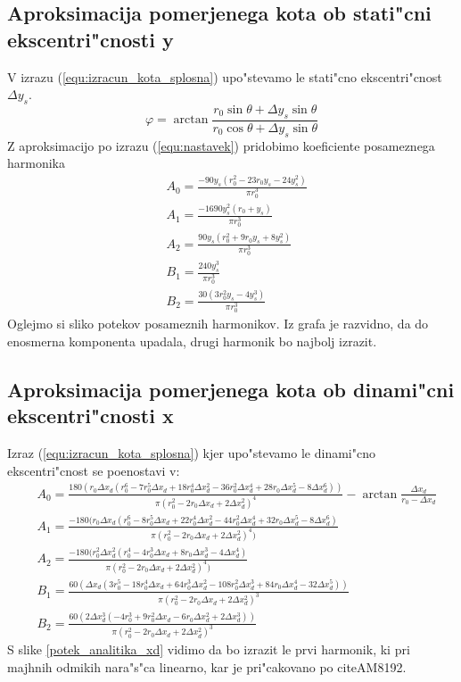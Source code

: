 \subsection{Aproksimacija pomerjenega kota ob stati"cni ekscentri"cnosti y}
V izrazu (\ref{equ:izracun_kota_splosna}) upo"stevamo le stati"cno ekscentri"cnost $\Delta y_s$.
\begin{equation}
\label{equ:izracun_kota_ys}
\varphi=\arctan \frac{r_0 \sin\theta +\Delta y_s \sin\theta}{r_0 \cos\theta +\Delta y_s \sin\theta}
\end{equation}
Z aproksimacijo po izrazu (\ref{equ:nastavek}) pridobimo koeficiente posameznega harmonika
\begin{eqnarray}
&A_0=\frac{-90 y_s (r_0^2-23r_0 y_s-24y _s^2)}{\pi r_0^3}\\
&A_1=\frac{-1690 y_s^2(r_0+y_s)}{\pi r_0^3}\\
&A_2=\frac{90 y_s(r_0^2+9r_0y_s+8y_s^2)}{\pi r_0^3}\\
&B_1=\frac{240 y_s^3}{\pi r_0^3}\\
&B_2=\frac{30 (3 r_0^2y_s-4 y_s^3)}{\pi r_0^3}
\end{eqnarray}
Oglejmo si sliko potekov posameznih harmonikov.
Iz grafa je razvidno, da do enosmerna komponenta upadala, drugi harmonik bo najbolj izrazit.
\subsection{Aproksimacija pomerjenega kota ob dinami"cni ekscentri"cnosti x}
Izraz  (\ref{equ:izracun_kota_splosna}) kjer upo"stevamo le dinami"cno ekscentri"cnost se poenostavi v:
\begin{eqnarray}
&A_0=\frac{180(r_0 \Delta x_d(r_0^6-7r_0^5 \Delta x_d+18r_0^4 \Delta x_d^2-36r_0^2 \Delta x_d^4 +28r_0 \Delta x_d^5-8 \Delta x_d^6))}{\pi(r_0^2-2r_0 \Delta x_d+2 \Delta x_d^2)^4}-\arctan \frac{\Delta x_d}{r_0- \Delta x_d}\\
&A_1=\frac{-180(r_0 \Delta x_d(r_0^6-8r_0^5 \Delta x_d+22r_0^4 \Delta x_d^2-44r_0^2 \Delta x_d^4 
	+32r_0 \Delta x_d^5-8 \Delta x_d^6)}{\pi (r_0^2-2r_0 \Delta x_d+2 \Delta x_d^2)^4)}\\
&A_2=\frac{-180(r_0^2 \Delta x_d^2 (r_0^4-4 r_0^3  \Delta x_d+8 r_0  \Delta x_d^3-4 
	\Delta x_d^4)}{\pi (r_0^2-2 r_0  \Delta x_d+2  \Delta x_d^2)^4)}\\
&B_1=\frac{60( \Delta x_d (3 r_0^5-18 r_0^4  \Delta x_d+64 r_0^3  \Delta x_d^2 -108 
	r_0^2  \Delta x_d^3+84 r_0  \Delta x_d^4-32  \Delta x_d^5))}{\pi (r_0^2-2 r_0 
	\Delta x_d+2  \Delta x_d^2)^3}\\
&B_2=\frac{60 (2  \Delta x_d^3 (-4 r_0^3+9 r_0^2  \Delta x_d-6 r_0  \Delta x_d^2+2  \Delta x_d
	^3))}{\pi(r_0^2-2 r_0  \Delta x_d+2  \Delta x_d^2)^3}
\end{eqnarray}
S slike \ref{potek_analitika_xd} vidimo da bo izrazit le prvi harmonik, ki pri majhnih odmikih nara"s"ca linearno, kar je pri"cakovano po citeAM8192. 

